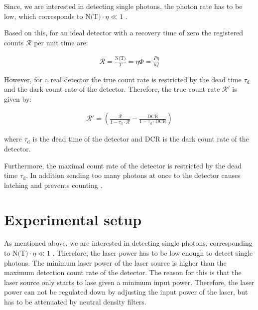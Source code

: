 Since, we are interested in detecting single photons, the photon rate has to be low, which corresponds to
$\text{N(T)} \cdot \eta \ll 1$ \cite{hadfield-2009}.

Based on this, for an ideal detector with a recovery time of zero the registered counts $\mathcal{R}$ per unit time are:

\begin{align}
    \mathcal{R} = \frac{\text{N(T)}}{T} = \eta \Phi= \frac{P \eta}{h f}
\end{align}

However, for a real detector the true count rate is restricted by the dead time $\tau_{\text{d}}$ and
the dark count rate of the detector.
Therefore, the true count rate $\mathcal{R}'$ is given by:


\begin{align}\label{eq:true_count_rate}
    \mathcal{R}' = \left(\frac{\mathcal{R}}{1 - \tau_{\text{d}} \cdot \mathcal{R}}
    - \frac{\text{DCR}}{1 - \tau_{\text{d}} \cdot \text{DCR}}\right)
\end{align}

where $\tau_{\text{d}}$ is the dead time of the detector and DCR is the dark count rate of the detector.

Furthermore, the maximal count rate of the detector is restricted by the dead time $\tau_{\text{d}}$.
In addition sending too many photons at once to the detector causes latching and prevents counting \cite{single-quantum-2022}.

\section{Experimental setup}\label{sec:experimental_setup}
As mentioned above, we are interested in detecting single photons, corresponding to $\text{N(T)} \cdot \eta \ll 1$ \cite{hadfield-2009}.
Therefore, the laser power has to be low enough to detect single photons.
The minimum laser power of the laser source is higher than the maximum detection count rate of the detector.
The reason for this is that the laser source only starts to lase given a minimum input power.
Therefore, the laser power can not be regulated down by adjusting the input power of the laser, but has to be attenuated
by neutral density filters.\\

